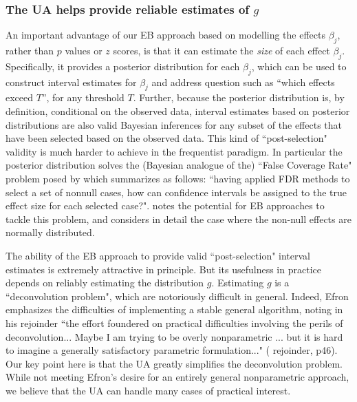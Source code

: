 \documentclass[11pt]{article}
\def\bhat{\hat{\beta}}
\begin{document}
\subsubsection*{The UA helps provide reliable estimates of $g$}

An important advantage of our EB approach based on modelling the effects $\beta_j$, rather than $p$ values or $z$ scores, is that it
can estimate the {\it size} of each effect $\beta_j$.
Specifically, it provides a posterior distribution for each $\beta_j$, which can be used
to construct interval estimates for $\beta_j$ and address question such as ``which effects exceed $T$'', for any 
threshold $T$.
Further, because the posterior distribution is, by definition,
conditional on the observed data, interval estimates based on posterior distributions are also valid Bayesian inferences for any subset of the effects that have
been selected based on the observed data. This kind of ``post-selection" validity is much harder to achieve in the frequentist paradigm.
In particular the posterior distribution solves the (Bayesian analogue of the) ``False Coverage Rate" problem posed by
\cite{benjamini2005false} which \cite{efron2008microarrays} summarizes as follows: ``having applied FDR methods to select a set of nonnull cases,
how can confidence intervals be assigned to the true
effect size for each selected case?". \cite{efron2008microarrays} notes the potential for EB approaches to tackle this problem,
and \cite{zhao2012empirical} considers in detail the case where the non-null effects are normally distributed.

The ability of the EB approach to provide valid ``post-selection" interval estimates is extremely attractive in principle.
But its usefulness in practice
depends on reliably estimating the distribution $g$. Estimating $g$ is a ``deconvolution problem",
which are notoriously difficult in general. Indeed, Efron emphasizes
the difficulties of implementing a stable general algorithm, noting in his rejoinder
``the effort foundered on practical difficulties involving the perils of deconvolution... Maybe I am trying
to be overly nonparametric ... but it is hard to imagine a
generally satisfactory parametric formulation..." (\cite{efron2008microarrays} rejoinder, p46).
Our key point here is that the UA greatly simplifies the deconvolution problem.
While not meeting Efron's desire for an entirely general nonparametric approach, we believe 
that the UA can handle many cases of practical interest. 
\end{document}
